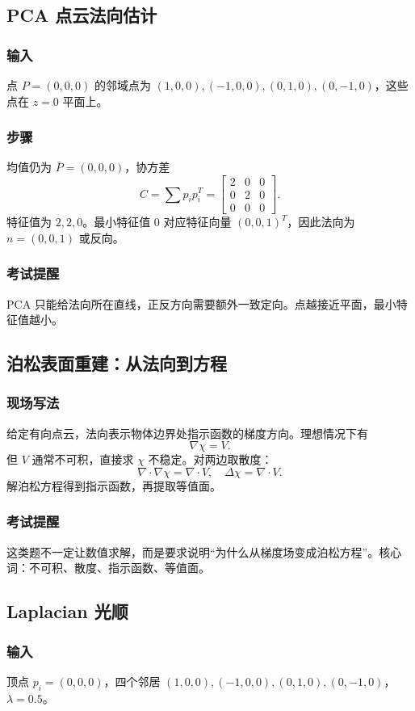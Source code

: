 \documentclass[UTF8,fontset=fandol,11pt]{ctexart}
\begin{document}
\subsection{PCA 点云法向估计}
\subsubsection*{输入}
点 $P=(0,0,0)$ 的邻域点为 $(1,0,0),(-1,0,0),(0,1,0),(0,-1,0)$，这些点在 $z=0$ 平面上。
\subsubsection*{步骤}
均值仍为 $\bar P=(0,0,0)$，协方差
\[
C=\sum p_ip_i^T=
\begin{bmatrix}
2&0&0\\
0&2&0\\
0&0&0
\end{bmatrix}.
\]
特征值为 $2,2,0$。最小特征值 $0$ 对应特征向量 $(0,0,1)^T$，因此法向为 $n=(0,0,1)$ 或反向。
\subsubsection*{考试提醒}
PCA 只能给法向所在直线，正反方向需要额外一致定向。点越接近平面，最小特征值越小。

\subsection{泊松表面重建：从法向到方程}
\subsubsection*{现场写法}
给定有向点云，法向表示物体边界处指示函数的梯度方向。理想情况下有
\[
  \nabla\chi=V.
\]
但 $V$ 通常不可积，直接求 $\chi$ 不稳定。对两边取散度：
\[
  \nabla\cdot\nabla\chi=\nabla\cdot V,\quad \Delta\chi=\nabla\cdot V.
\]
解泊松方程得到指示函数，再提取等值面。
\subsubsection*{考试提醒}
这类题不一定让数值求解，而是要求说明“为什么从梯度场变成泊松方程”。核心词：不可积、散度、指示函数、等值面。

\subsection{Laplacian 光顺}
\subsubsection*{输入}
顶点 $p_i=(0,0,0)$，四个邻居 $(1,0,0),(-1,0,0),(0,1,0),(0,-1,0)$，$\lambda=0.5$。
\end{document}
